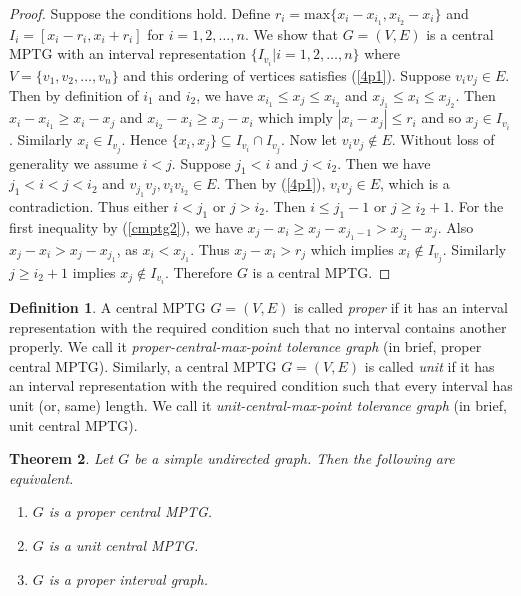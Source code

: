 \documentclass{article}
\newtheorem{thm}{Theorem}[section]
\theoremstyle{definition}
\newtheorem{defn}[thm]{Definition}
\numberwithin{equation}{section}
\begin{document}
\begin{proof}
Suppose the conditions hold. Define $r_{i}=\text{max}\{x_{i}-x_{i_{1}},x_{i_{2}}-x_{i}\}$ and $I_{i}=[x_{i}-r_{i},x_{i}+r_{i}]$ for $i=1,2,\hdots,n$. We show that $G=(V,E)$ is a central MPTG with an interval representation $\{I_{v_{i}}|i=1,2,\hdots,n\}$ where $V=\{v_{1},v_{2},\hdots,v_{n}\}$ and this ordering of vertices satisfies (\ref{4p1}). Suppose $v_{i}v_{j}\in E$. Then by definition of $i_{1}$ and $i_{2}$, we have $x_{i_{1}}\leq x_{j}\leq x_{i_{2}}$ and $x_{j_{1}}\leq x_{i}\leq x_{j_{2}}$. Then $x_{i}-x_{i_{1}}\geq x_{i}-x_{j}$ and $x_{i_{2}}-x_{i}\geq x_{j}-x_{i}$ which imply $|x_{i}-x_{j}|\leq r_{i}$ and so $x_{j}\in I_{v_{i}}$. Similarly $x_{i}\in I_{v_{j}}$. Hence $\{x_{i},x_{j}\}\subseteq I_{v_{i}}\cap I_{v_{j}}$. Now let $v_{i}v_{j}\notin E$. Without loss of generality we assume $i<j$. Suppose $j_{1}<i$ and $j<i_{2}$. Then we have $j_{1}<i<j<i_{2}$ and $v_{j_{1}}v_{j},v_{i}v_{i_{2}}\in E$. Then by (\ref{4p1}), $v_{i}v_{j}\in E$, which is a contradiction. Thus either $i<j_{1}$ or $j>i_{2}$. Then $i\leq j_{1}-1$ or $j\geq i_{2}+1$. For the first inequality by (\ref{cmptg2}), we have $x_{j}-x_{i}\geq x_{j}-x_{j_{1}-1}> x_{j_{2}}-x_{j}$. Also $x_{j}-x_{i}>x_{j}-x_{j_{1}}$, as $x_{i}<x_{j_{1}}$. Thus $x_{j}-x_{i}>r_{j}$ which implies $x_{i}\notin I_{v_{j}}$. Similarly $j\geq i_{2}+1$ implies $x_{j}\notin I_{v_{i}}$. Therefore $G$ is a central MPTG.
\end{proof}


\begin{defn}
A central MPTG $G=(V,E)$ is called {\em proper} if it has an interval representation with the required condition such that no interval contains another properly. We call it {\em proper-central-max-point tolerance graph} (in brief, proper central MPTG). Similarly, a central MPTG $G=(V,E)$ is called {\em unit} if it has an interval representation with the required condition such that every interval has unit (or, same) length. We call it {\em unit-central-max-point tolerance graph} (in brief, unit central MPTG).  
\end{defn}

\begin{thm}\label{pi1}
Let $G$ be a simple undirected graph. Then the following are equivalent.

\begin{enumerate}

\item $G$ is a proper central MPTG.
\item $G$ is a unit central MPTG.
\item $G$ is a proper interval graph.

\end{enumerate}
\end{thm}
\end{document}
